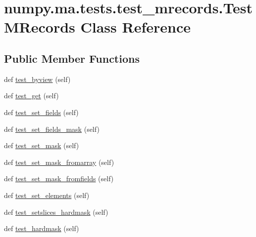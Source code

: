 \hypertarget{classnumpy_1_1ma_1_1tests_1_1test__mrecords_1_1TestMRecords}{}\section{numpy.\+ma.\+tests.\+test\+\_\+mrecords.\+Test\+M\+Records Class Reference}
\label{classnumpy_1_1ma_1_1tests_1_1test__mrecords_1_1TestMRecords}
\subsection*{Public Member Functions}
\begin{DoxyCompactItemize}
\item 
def \hyperlink{classnumpy_1_1ma_1_1tests_1_1test__mrecords_1_1TestMRecords_a5d3a4b4c4b29ed1b4adbedf41bac151e}{test\+\_\+byview} (self)
\item 
def \hyperlink{classnumpy_1_1ma_1_1tests_1_1test__mrecords_1_1TestMRecords_a048fcda2fa64b2a41aa861b51023d21a}{test\+\_\+get} (self)
\item 
def \hyperlink{classnumpy_1_1ma_1_1tests_1_1test__mrecords_1_1TestMRecords_ae3ae5128dd241d4aaba893018b48f717}{test\+\_\+set\+\_\+fields} (self)
\item 
def \hyperlink{classnumpy_1_1ma_1_1tests_1_1test__mrecords_1_1TestMRecords_a450156a59c92adb2480d6378e942b799}{test\+\_\+set\+\_\+fields\+\_\+mask} (self)
\item 
def \hyperlink{classnumpy_1_1ma_1_1tests_1_1test__mrecords_1_1TestMRecords_ac4a16d57c9bf16dc90d0554d27b292fd}{test\+\_\+set\+\_\+mask} (self)
\item 
def \hyperlink{classnumpy_1_1ma_1_1tests_1_1test__mrecords_1_1TestMRecords_ac012d36aa3a4eff12bf6bbd3b7b48be7}{test\+\_\+set\+\_\+mask\+\_\+fromarray} (self)
\item 
def \hyperlink{classnumpy_1_1ma_1_1tests_1_1test__mrecords_1_1TestMRecords_a0ec64030138cb7d31d63fb4b66e180a1}{test\+\_\+set\+\_\+mask\+\_\+fromfields} (self)
\item 
def \hyperlink{classnumpy_1_1ma_1_1tests_1_1test__mrecords_1_1TestMRecords_add92e9b355a586b6bfdf17df7c281e53}{test\+\_\+set\+\_\+elements} (self)
\item 
def \hyperlink{classnumpy_1_1ma_1_1tests_1_1test__mrecords_1_1TestMRecords_abe61b59a099c681c30fbfb60144d4a86}{test\+\_\+setslices\+\_\+hardmask} (self)
\item 
def \hyperlink{classnumpy_1_1ma_1_1tests_1_1test__mrecords_1_1TestMRecords_a553837353597a0b34e738b5ba09eb892}{test\+\_\+hardmask} (self)

\end{DoxyCompactItemize}

